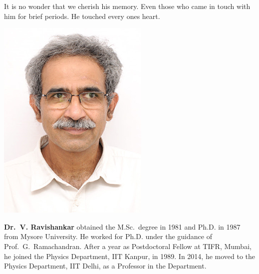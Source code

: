 It is no wonder that we cherish his memory. Even those who came in touch with him for brief periods. He touched every ones heart.


\centerline{\includegraphics[scale=.3]{authorsphotos/V_Ravishankar.jpg}}
\smallskip

\bigskip

\noindent
\textbf{Dr.\ V. Ravishankar} obtained the M.Sc.\ degree in 1981 and Ph.D. in 1987 from Mysore University. He worked for Ph.D. under the guidance of Prof.\ G.\ Ramachandran. After a year as Postdoctoral Fellow at TIFR, Mumbai, he joined the Physics Department, IIT Kanpur, in 1989. In 2014, he moved to the Physics Department, IIT Delhi, as a Professor in the Department.
